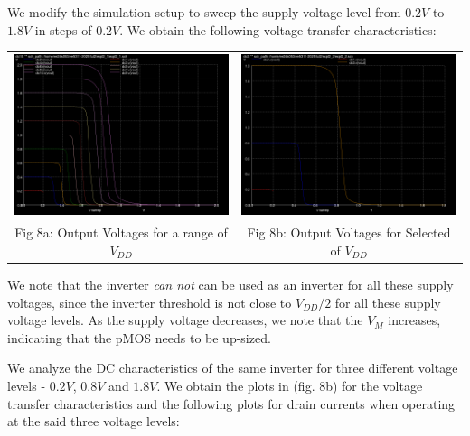 \documentclass[12pt,a4paper]{article}
\begin{document}
\noindent We modify the simulation setup to sweep the supply voltage level from $0.2V$ to $1.8V$ in steps of $0.2V$. We obtain the following voltage transfer characteristics:
\begin{center}
\begin{tabular}{cc}
\includegraphics[width=0.49\linewidth]{tut2/reports/media/expt2_1_vtc.png} &
\includegraphics[width=0.49\linewidth]{tut2/reports/media/expt2_2_vtc.png} \\
Fig 8a: Output Voltages for a range of $V_{DD}$ & Fig 8b: Output Voltages for Selected of $V_{DD}$
\end{tabular}
\end{center}

\noindent We note that the inverter \emph{can not} can be used as an inverter for all these supply voltages, since the inverter threshold is not close to $V_{DD}/2$ for all these supply voltage levels. As the supply voltage decreases, we note that the $V_M$ increases, indicating that the pMOS needs to be up-sized.
\newline \newline

\noindent We analyze the DC characteristics of the same inverter for three different voltage levels - $0.2V$, $0.8V$ and $1.8V$. We obtain the plots in (fig. 8b) for the voltage transfer characteristics and the following plots for drain currents when operating at the said three voltage levels:
\end{document}
